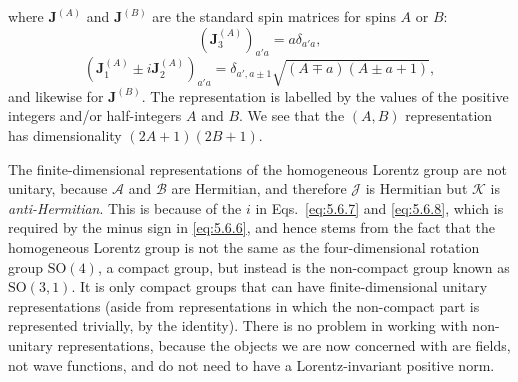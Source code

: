 where $\mathbf J^{(A)}$ and $\mathbf J^{(B)}$ are the standard spin matrices
for spins $A$ or $B$:
\begin{equation}
(\mathbf J_3^{(A)})_{a'a}=a\delta_{a'a},
\tag{5.6.16}\label{eq:5.6.16}
\end{equation}
\begin{equation}
(\mathbf J_1^{(A)}\mathbin{\pm}i\mathbf J_2^{(A)})_{a'a}
=\delta_{a',a\pm1}\sqrt{(A\mp a)(A\pm a+1)},
\tag{5.6.17}\label{eq:5.6.17}
\end{equation}
and likewise for $\mathbf J^{(B)}$. The representation is labelled by the
values of the positive integers and/or half-integers $A$ and $B$. We see that
the $(A,B)$ representation has dimensionality $(2A+1)(2B+1)$.

The finite-dimensional representations of the homogeneous Lorentz group are
not unitary, because $\mathcal{A}$ and $\mathcal{B}$ are Hermitian, and
therefore $\mathcal{J}$ is Hermitian but $\mathcal{K}$ is
\emph{anti-Hermitian}. This is because of the $i$ in Eqs.~\eqref{eq:5.6.7} and \eqref{eq:5.6.8},
which is required by the minus sign in \eqref{eq:5.6.6}, and hence stems from the fact
that the homogeneous Lorentz group is not the same as the four-dimensional
rotation group $\mathrm{SO}(4)$, a compact group, but instead is the
non-compact group known as $\mathrm{SO}(3,1)$. It is only compact groups that
can have finite-dimensional unitary representations (aside from
representations in which the non-compact part is represented trivially, by the
identity). There is no problem in working with non-unitary representations,
because the objects we are now concerned with are fields, not wave functions,
and do not need to have a Lorentz-invariant positive norm.

